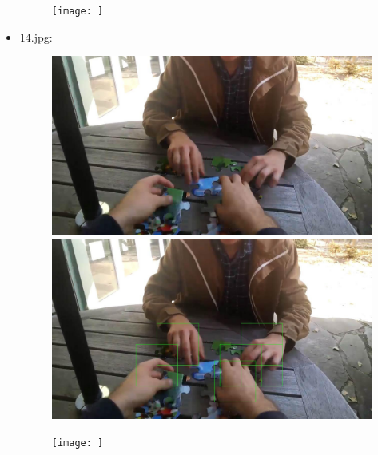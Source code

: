 \begin{itemize}
\begin{figure}[!htb]
\begin{minipage}{0.33\textwidth}
            \end{minipage}\hfill
            \begin{minipage}{0.33\textwidth}
                \centering
                \texttt{[image: ]}
            \end{minipage}
        \end{figure}
    \newpage
    \item 14.jpg:
        \begin{figure}[!htb]
            \begin{minipage}{0.33\textwidth}
            \centering
            \includegraphics[scale = 0.135]{images/results/original/14.jpg}
            \end{minipage}\hfill
            \begin{minipage}{0.33\textwidth}
                \centering
                \includegraphics[scale = 0.135]{images/results/detection/14_detections.jpg}
            \end{minipage}\hfill
            \begin{minipage}{0.33\textwidth}
                \centering
                \texttt{[image: ]}

\end{minipage}
\end{figure}
\end{itemize}
